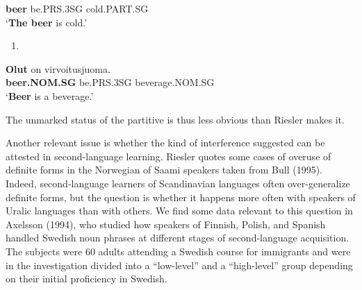 \textbf{beer} be.PRS.3SG  cold.PART.SG\\ %


‘\textbf{The beer} is cold.’
\z

\begin{enumerate} %
\item 
\end{enumerate} %
\ea\label{}
\gll \textbf{Olut} on  virvoitusjuoma.\\


\textbf{beer.NOM.SG} be.PRS.3SG  beverage.NOM.SG\\ %


‘\textbf{Beer} is a beverage.’
\z

The unmarked status of the partitive is thus less obvious than Riesler makes it. 

Another relevant issue is whether the kind of interference suggested can be attested in second-language learning. Riesler quotes some cases of overuse of definite forms in the Norwegian of Saami speakers taken from Bull (1995). Indeed, second-language learners of Scandinavian languages often over-generalize definite forms, but the question is whether it happens more often with speakers of Uralic languages than with others. We find some data relevant to this question in Axelsson (1994), who studied how speakers of Finnish, Polish, and Spanish handled Swedish noun phrases at different stages of second-language acquisition. The subjects were 60 adults attending a Swedish course for immigrants and were in the investigation divided into a “low-level” and a “high-level” group depending on their initial proficiency in Swedish.

